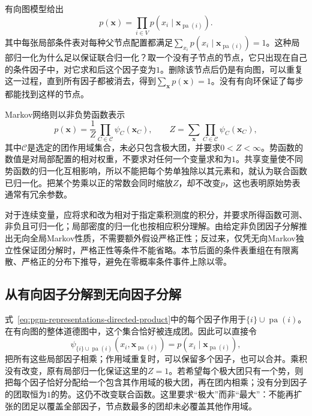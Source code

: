 有向图模型给出
\begin{equation}
  p(\bm{x})=\prod_{i\in V}
  p(x_i\mid\bm{x}_{\operatorname{pa}(i)}).
  \label{eq:pgm-representations-directed-product}
\end{equation}
其中每张局部条件表对每种父节点配置都满足$\sum_{x_i}p(x_i\mid\bm{x}_{\operatorname{pa}(i)})=1$。这种局部归一化为什么足以保证联合归一化？取一个没有子节点的节点，它只出现在自己的条件因子中，对它求和后这个因子变为$1$。删除该节点后仍是有向图，可以重复这一过程，直到所有因子都被消去，得到$\sum_{\bm{x}}p(\bm{x})=1$。没有有向环保证了每步都能找到这样的节点。

Markov网络则以非负势函数表示
\begin{equation}
  p(\bm{x})=\frac{1}{Z}
  \prod_{C\in\mathcal{C}}\psi_C(\bm{x}_C),
  \qquad
  Z=\sum_{\bm{x}}\prod_{C\in\mathcal{C}}\psi_C(\bm{x}_C),
  \label{eq:pgm-representations-undirected-product}
\end{equation}
其中$\mathcal{C}$是选定的团作用域集合，未必只包含极大团，并要求$0<Z<\infty$。势函数的数值是对局部配置的相对权重，不要求对任何一个变量求和为$1$。共享变量使不同势函数的归一化互相影响，所以不能把每个势单独除以其元素和，就认为联合函数已归一化。把某个势乘以正的常数会同时缩放$Z$，却不改变$p$，这也表明原始势表通常有冗余参数。

对于连续变量，应将求和改为相对于指定乘积测度的积分，并要求所得函数可测、非负且可归一化；局部密度的归一化也按相应积分理解。由给定非负团因子分解推出无向全局Markov性质，不需要额外假设严格正性；反过来，仅凭无向Markov独立性保证团分解时，严格正性等条件不能省略。本节后面的条件表重组在有限离散、严格正的分布下推导，避免在零概率条件事件上除以零。

\subsection{从有向因子分解到无向因子分解}
\label{sec:pgm-representations-directed-to-undirected}

式~\eqref{eq:pgm-representations-directed-product}中的每个因子作用于$\{i\}\cup\operatorname{pa}(i)$。在有向图的整体道德图中，这个集合恰好被连成团。因此可以直接令
\[
  \psi_{\{i\}\cup\operatorname{pa}(i)}
  (x_i,\bm{x}_{\operatorname{pa}(i)})
  =
  p(x_i\mid\bm{x}_{\operatorname{pa}(i)}),
\]
把所有这些局部因子相乘；作用域重复时，可以保留多个因子，也可以合并。乘积没有改变，原有局部归一化保证这里的$Z=1$。若希望每个极大团只有一个势，则把每个因子恰好分配给一个包含其作用域的极大团，再在团内相乘；没有分到因子的团取恒为$1$的势。这仍不改变联合函数。这里要求“极大”而非“最大”：不能再扩张的团足以覆盖全部因子，节点数最多的团却未必覆盖其他作用域。


